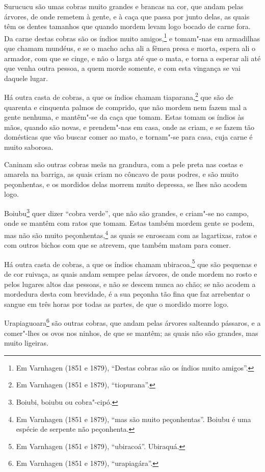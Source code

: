 Surucucu são umas cobras muito grandes e brancas na cor, que andam pelas árvores, de onde
remetem à gente, e à caça que passa por junto delas, as quais têm os dentes tamanhos que
quando mordem levam logo bocado de carne fora. Da carne destas cobras são os índios muito
amigos,\footnote{ Em Varnhagen (1851 e 1879), ``Destas cobras são os índios muito
amigos''.} e tomam"-nas em armadilhas que chamam mundéus, e se o macho acha ali a fêmea
presa e morta, espera ali o armador, com que se cinge, e não o larga até que o mata, e
torna a esperar ali até que venha outra pessoa, a quem morde somente, e com esta vingança
se vai daquele lugar.

Há outra casta de cobras, a que os índios chamam tiaparana,\footnote{ Em Varnhagen (1851 e
1879), ``tiopurana''.} que são de quarenta e cinquenta palmos de comprido, que não mordem
nem fazem mal a gente nenhuma, e mantêm"-se da caça que tomam. Estas tomam os índios às
mãos, quando são novas, e prendem"-nas em casa, onde as criam, e se fazem tão domésticas
que vão buscar comer ao mato, e tornam"-se para casa, cuja carne é muito saborosa.

Caninam são outras cobras meãs na grandura, com a pele preta nas costas e amarela na
barriga, as quais criam no côncavo de paus podres, e são muito peçonhentas, e os mordidos
delas morrem muito depressa, se lhes não acodem logo.

Boiubu\footnote{ Boiubi, boiubu ou cobra"-cipó.} quer dizer ``cobra verde'', que não são
grandes, e criam"-se no campo, onde se mantêm com ratos que tomam. Estas também mordem
gente se podem, mas não são muito peçonhentas,\footnote{ Em Varnhagen (1851 e 1879), ``mas
são muito peçonhentas''. Boiubu é uma espécie de serpente não peçonhenta.} as quais se
enroscam com as lagartixas, ratos e com outros bichos com que se atrevem, que também matam
para comer.

Há outra casta de cobras, a que os índios chamam ubiracoa,\footnote{ Em Varnhagen (1851 e
1879), ``ubiracoá''. Ubiraquá.} que são pequenas e de cor ruivaça, as quais andam sempre
pelas árvores, de onde mordem no rosto e pelos lugares altos das pessoas, e não se descem
nunca ao chão; se não acodem a mordedura desta com brevidade, é a sua peçonha tão fina que
faz arrebentar o sangue em três horas por todas as partes, de que o mordido morre logo.

Urapiaguoara\footnote{ Em Varnhagen (1851 e 1879), ``urapiagára''.} são outras cobras, que
andam pelas árvores salteando pássaros, e a comer"-lhes os ovos nos ninhos, de que se
mantêm; as quais não são grandes, mas muito ligeiras.

